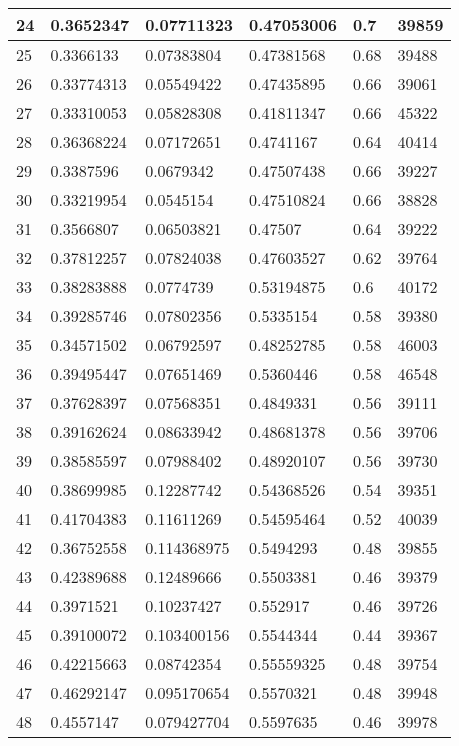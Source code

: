 \begin{longtable}{|l|l|l|l|l|l|}
24 & 0.3652347 & 0.07711323 & 0.47053006 & 0.7 & 39859 \\ \hline 
25 & 0.3366133 & 0.07383804 & 0.47381568 & 0.68 & 39488 \\ \hline 
26 & 0.33774313 & 0.05549422 & 0.47435895 & 0.66 & 39061 \\ \hline 
27 & 0.33310053 & 0.05828308 & 0.41811347 & 0.66 & 45322 \\ \hline 
28 & 0.36368224 & 0.07172651 & 0.4741167 & 0.64 & 40414 \\ \hline 
29 & 0.3387596 & 0.0679342 & 0.47507438 & 0.66 & 39227 \\ \hline 
30 & 0.33219954 & 0.0545154 & 0.47510824 & 0.66 & 38828 \\ \hline 
31 & 0.3566807 & 0.06503821 & 0.47507 & 0.64 & 39222 \\ \hline 
32 & 0.37812257 & 0.07824038 & 0.47603527 & 0.62 & 39764 \\ \hline 
33 & 0.38283888 & 0.0774739 & 0.53194875 & 0.6 & 40172 \\ \hline 
34 & 0.39285746 & 0.07802356 & 0.5335154 & 0.58 & 39380 \\ \hline 
35 & 0.34571502 & 0.06792597 & 0.48252785 & 0.58 & 46003 \\ \hline 
36 & 0.39495447 & 0.07651469 & 0.5360446 & 0.58 & 46548 \\ \hline 
37 & 0.37628397 & 0.07568351 & 0.4849331 & 0.56 & 39111 \\ \hline 
38 & 0.39162624 & 0.08633942 & 0.48681378 & 0.56 & 39706 \\ \hline 
39 & 0.38585597 & 0.07988402 & 0.48920107 & 0.56 & 39730 \\ \hline 
40 & 0.38699985 & 0.12287742 & 0.54368526 & 0.54 & 39351 \\ \hline 
41 & 0.41704383 & 0.11611269 & 0.54595464 & 0.52 & 40039 \\ \hline 
42 & 0.36752558 & 0.114368975 & 0.5494293 & 0.48 & 39855 \\ \hline 
43 & 0.42389688 & 0.12489666 & 0.5503381 & 0.46 & 39379 \\ \hline 
44 & 0.3971521 & 0.10237427 & 0.552917 & 0.46 & 39726 \\ \hline 
45 & 0.39100072 & 0.103400156 & 0.5544344 & 0.44 & 39367 \\ \hline 
46 & 0.42215663 & 0.08742354 & 0.55559325 & 0.48 & 39754 \\ \hline 
47 & 0.46292147 & 0.095170654 & 0.5570321 & 0.48 & 39948 \\ \hline 
48 & 0.4557147 & 0.079427704 & 0.5597635 & 0.46 & 39978 \\ \hline 

\end{longtable}
